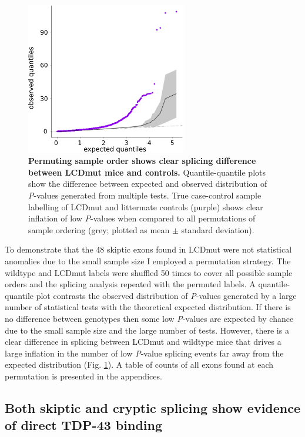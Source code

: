 \begin{figure}[h!]
	\centering
	\includegraphics[width=7cm]{Figures/05_tdp_mice/permutation_ribbon.png}
	\caption[Permuting sample order shows clear splicing difference in LCDmut mice]{
		\textbf{Permuting sample order shows clear splicing difference between LCDmut mice and controls.}
		Quantile-quantile plots show the difference between expected and observed distribution of \textit{P}-values generated from multiple tests. True case-control sample labelling of LCDmut and littermate controls (purple) shows clear inflation of low \textit{P}-values when compared to all permutations of sample ordering (grey; plotted as mean $\pm$ standard deviation).
	}
	\label{fig:permutation}
\end{figure}

To demonstrate that the 48 skiptic exons found in LCDmut were not statistical anomalies due to the small sample size I employed a permutation strategy.
 The wildtype and LCDmut labels were shuffled 50 times to cover all possible sample orders and the splicing analysis repeated with the permuted labels. 
A quantile-quantile plot contrasts the observed distribution of \textit{P}-values generated by a large number of statistical tests with the theoretical expected distribution. 
If there is no difference between genotypes then some low \textit{P}-values are expected by chance due to the small sample size and the large number of tests. 
However, there is a clear difference in splicing between LCDmut and wildtype mice that drives a large inflation in the number of low \textit{P}-value splicing events far away from the expected distribution (Fig. \ref{fig:permutation}).
A table of counts of all exons found at each permutation is presented in the appendices.   


\subsection{Both skiptic and cryptic splicing show evidence of direct TDP-43 binding}

